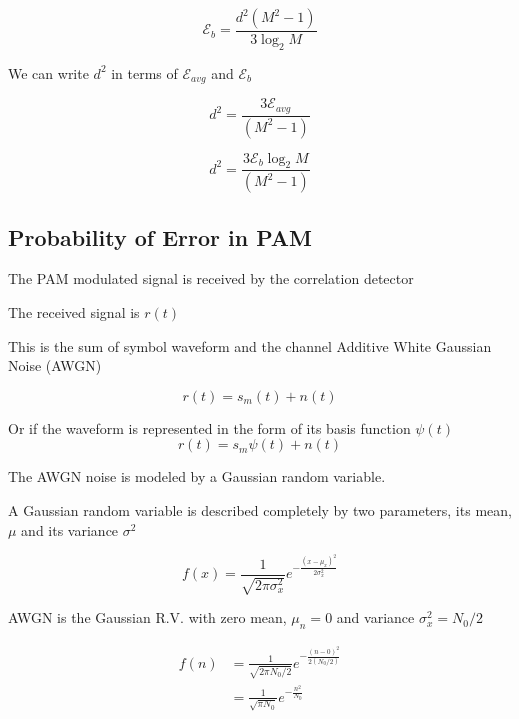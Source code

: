 \documentclass[a4paper]{article}
\numberwithin{equation}{subsection}
\begin{document}
	
	\begin{equation}\label{eq:eb}
	\mathcal{E}_{b}=\frac{d^2(M^2-1)}{3\log_2{M}}
	\end{equation}
	
	We can write $d^2$ in terms of $\mathcal{E}_{avg}$ and $\mathcal{E}_{b}$
	
	\begin{equation}\label{eq:dinEavg}
	d^2=\frac{3\mathcal{E}_{avg}}{(M^2-1)}
	\end{equation}
	
	
	\begin{equation}\label{eq:dinEb}
	d^2=\frac{3\mathcal{E}_{b}\log_2{M}}{(M^2-1)}
	\end{equation}
	
	
	\subsection{Probability of Error in PAM}
	
	The PAM modulated signal is received by the correlation detector
	
	The received signal is $r(t)$
	
	This is the sum of symbol waveform and the channel Additive White Gaussian Noise (AWGN)
	
	\begin{equation}\label{key}
	r(t)=s_m(t)+n(t)
	\end{equation}
	
	Or if the waveform is represented in the form of its basis function $\psi(t)$
	\begin{equation}\label{eq:rtbasis}
	r(t)=s_m \psi(t)+n(t)
	\end{equation}
	
	The AWGN noise is modeled by a Gaussian random variable.
	
	A Gaussian random variable is described completely by two parameters, its mean, $\mu$ and its variance $\sigma^2$
	
	\begin{equation}\label{eq:fnormal}
	f(x)=\frac{1}{\sqrt{2\pi \sigma_x^2}} e^{ -\frac{(x-\mu_x)^2}{2\sigma_x^2}}
	\end{equation}
	
	AWGN is the Gaussian R.V. with zero mean, $\mu_n=0$ and variance $\sigma_x^2=N_0/2$
	
	\begin{equation}\label{eq:fawgn}
	\begin{aligned}
	f(n)
	&=\frac{1}{\sqrt{2\pi N_0/2}} e^{-\frac{(n-0)^2}{2 (N_0/2)}}\\
	&=\frac{1}{\sqrt{\pi N_0}} e^{-\frac{n^2}{N_0}}
	\end{aligned}
	\end{equation}
	
\end{document}
